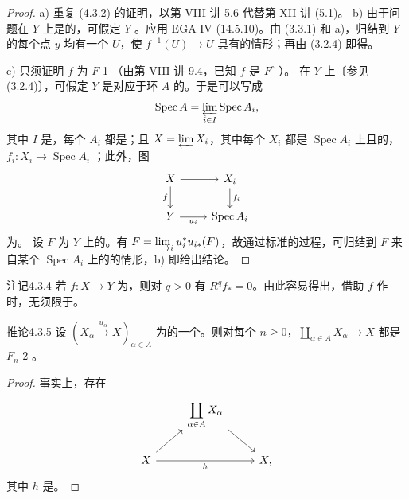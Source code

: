 \begin{proof}
 a) 重复 (4.3.2) 的证明，以第 VIII 讲 5.6 代替第 XII 讲 (5.1)。
 b) 由于问题在 $Y$ 上是的，可假定 $Y$ 。应用 EGA IV (14.5.10)。由 (3.3.1) 和 a)，归结到 $Y$ 的每个点 $y$ 均有一个 $U$，使 $f^{-1}(U)\to U$ 具有的情形；再由 (3.2.4) 即得。

 c) 只须证明 $f$ 为 $F$-1-（由第 VIII 讲 9.4，已知 $f$ 是 $F^\circ$-）。
在 $Y$ 上〔参见 (3.2.4)〕，可假定 $Y$ 是对应于环 $A$ 的。于是可以写成
\[
\operatorname{Spec}A=\varprojlim_{i\in I}\operatorname{Spec}A_i,
\]
其中 $I$ 是，每个 $A_i$ 都是；且 $X=\varprojlim X_i$，其中每个 $X_i$ 都是 $\operatorname{Spec}A_i$ 上且的，$f_i:X_i\to\operatorname{Spec}A_i$ ；此外，图
\[
\begin{tikzcd}
X\arrow[r]\arrow[d,"f"']&X_i\arrow[d,"f_i"]\\
Y\arrow[r,"u_i"']&\operatorname{Spec}A_i
\end{tikzcd}
\]
为。
设 $F$ 为 $Y$ 上的。有 $F=\varinjlim_i u_i^*u_{i*}(F)$，故通过标准的过程，可归结到 $F$ 来自某个 $\operatorname{Spec}A_i$ 上的的情形，b) 即给出结论。
\end{proof}
\begin{SGAresult}{注记}{4.3.4}
若 $f:X\to Y$ 为，则对 $q>0$ 有 $R^qf_*=0$。由此容易得出，借助 $f$ 作时，无须限于。
\end{SGAresult}
\begin{SGAresult}{推论}{4.3.5}
设 $(X_\alpha\xrightarrow{u_\alpha}X)_{\alpha\in A}$ 为的一个。则对每个 $n\geq0$，$\coprod_{\alpha\in A}X_\alpha\to X$ 都是 $F_n$-2-。
\end{SGAresult}
\begin{proof}
事实上，存在
\[
\begin{tikzcd}
&\displaystyle\coprod_{\alpha\in A}X_\alpha\arrow[dr]&\\
X\arrow[ur]\arrow[rr,"h"']&&X,
\end{tikzcd}
\]
其中 $h$ 是。
\end{proof}

